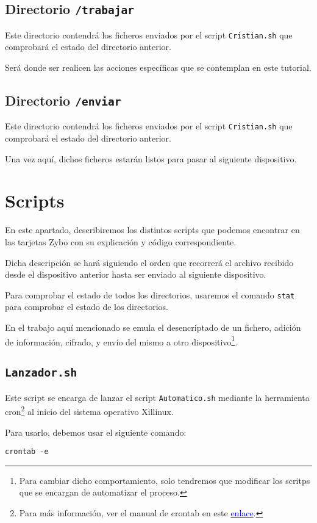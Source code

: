 \documentclass[12pt,letterpaper]{article}
\begin{document}
\subsection{Directorio \texttt{/trabajar}}
Este directorio contendrá los ficheros enviados por el script \texttt{Cristian.sh} que comprobará el estado del directorio anterior.

Será donde ser realicen las acciones específicas que se contemplan en este tutorial.

\subsection{Directorio \texttt{/enviar}}
Este directorio contendrá los ficheros enviados por el script \texttt{Cristian.sh} que comprobará el estado del directorio anterior.

Una vez aquí, dichos ficheros estarán listos para pasar al siguiente dispositivo.


\section{Scripts}
En este apartado, describiremos los distintos scripts que podemos encontrar en las tarjetas Zybo con su explicación y código correspondiente.

Dicha descripción se hará siguiendo el orden que recorrerá el archivo recibido desde el dispositivo anterior hasta ser enviado al siguiente dispositivo.

Para comprobar el estado de todos los directorios, usaremos el comando \texttt{stat} para comprobar el estado de los directorios.

En el trabajo aquí mencionado se emula el desencriptado de un fichero, adición de información, cifrado, y envío del mismo a otro dispositivo\footnote{Para cambiar dicho comportamiento, solo tendremos que modificar los scritps que se encargan de automatizar el proceso.}.


\subsection{\texttt{Lanzador.sh}}
Este script se encarga de lanzar el script \texttt{Automatico.sh} mediante la herramienta cron\footnote{Para más información, ver el manual de crontab en este \href{https://linux.die.net/man/5/crontab}{\textcolor{blue}{enlace}}.} al inicio del sistema operativo Xillinux.

Para usarlo, debemos usar el siguiente comando:
\begin{center}
	\texttt{crontab -e}
\end{center}
\end{document}
